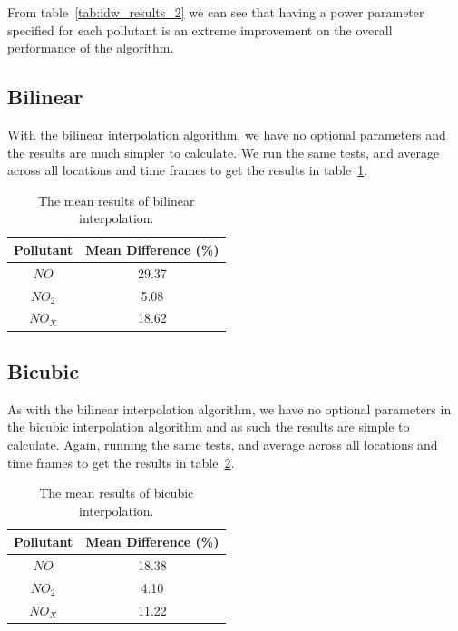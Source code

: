 			From table~\ref{tab:idw_results_2} we can see that having a power parameter specified for each pollutant is an extreme improvement on the overall performance of the algorithm. 

        \subsection{Bilinear}\label{prediction_evaluation_results_bilinear}


        	With the bilinear interpolation algorithm, we have no optional parameters and the results are much simpler to calculate. We run the same tests, and average across all locations and time frames to get the results in table~\ref{tab:bilinear_results}.

        	\begin{table}[H]
				\centering
	    		\begin{tabular}{|c|c|}
	    			\hline
					Pollutant & Mean Difference (\%) \\ \hline
					$NO$ & 29.37 \\
					$NO_{2}$ & 5.08 \\
					$NO_{X}$ & 18.62 \\
					\hline
				\end{tabular}
				\caption{The mean results of bilinear interpolation.}
				\label{tab:bilinear_results}
			\end{table} 

        \subsection{Bicubic}\label{prediction_evaluation_results_bicubic}


			As with the bilinear interpolation algorithm, we have no optional parameters in the bicubic interpolation algorithm and as such the results are simple to calculate. Again, running the same tests, and average across all locations and time frames to get the results in table~\ref{tab:bicubic_results}.

        	\begin{table}[H]
				\centering
	    		\begin{tabular}{|c|c|}
	    			\hline
					Pollutant & Mean Difference (\%) \\ \hline
					$NO$ & 18.38 \\
					$NO_{2}$ & 4.10 \\
					$NO_{X}$ & 11.22 \\
					\hline
				\end{tabular}
				\caption{The mean results of bicubic interpolation.}
				\label{tab:bicubic_results}
			\end{table} 

